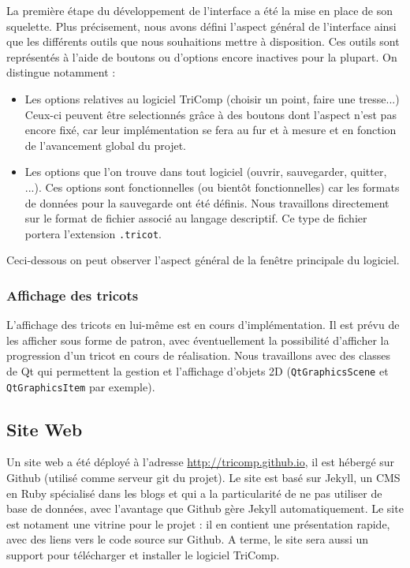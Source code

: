 \documentclass{article}
\begin{document}
La première étape du développement de l'interface a été la mise en place de son squelette. Plus précisement, nous avons défini l'aspect 
général de l'interface ainsi que les différents outils que nous souhaitions mettre à disposition. Ces outils sont représentés à l'aide de 
boutons ou d'options encore inactives pour la plupart. On distingue notamment :
\begin{itemize}
  \item Les options relatives au logiciel TriComp (choisir un point, faire une tresse...) Ceux-ci peuvent être selectionnés grâce à des 
boutons dont l'aspect n'est pas encore fixé, car leur implémentation se fera au fur et à mesure et en fonction de l'avancement global du 
projet.
  \item Les options que l'on trouve dans tout logiciel (ouvrir, sauvegarder, quitter, ...). Ces options sont fonctionnelles (ou bientôt 
fonctionnelles) car les formats de données pour la sauvegarde ont été définis. Nous travaillons directement sur le format de fichier 
associé au langage descriptif. Ce type de fichier portera l'extension \texttt{.tricot}.
\end{itemize}
Ceci-dessous on peut observer l'aspect général de la fenêtre principale du logiciel.

\subsubsection{Affichage des tricots}

L'affichage des tricots en lui-même est en cours d'implémentation. Il est prévu de les afficher sous forme de patron, avec éventuellement 
la possibilité d'afficher la progression d'un tricot en cours de réalisation. 
Nous travaillons avec des classes de Qt qui permettent la gestion et l'affichage d'objets 2D (\texttt{QtGraphicsScene} et \texttt
{QtGraphicsItem} par exemple).

\subsection{Site Web}

Un site web a été déployé à l'adresse \url{http://tricomp.github.io}, il est hébergé sur Github (utilisé comme serveur git du projet). Le 
site est basé sur Jekyll, un CMS en Ruby spécialisé dans les blogs et qui a la particularité de ne pas utiliser de base de données, avec 
l'avantage que Github gère Jekyll automatiquement. Le site est notament une vitrine pour le projet : il en contient une présentation 
rapide, avec des liens vers le code source sur Github. A terme, le site sera aussi un support pour télécharger et installer le logiciel 
TriComp.
\end{document}
